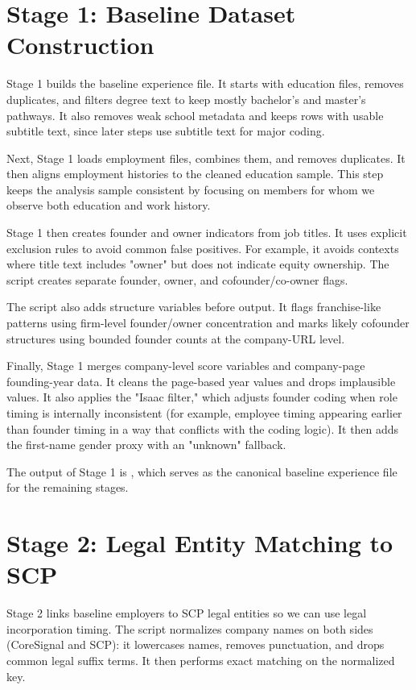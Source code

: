 \documentclass[12pt]{article}
\begin{document}
\section{Stage 1: Baseline Dataset Construction}

Stage 1 builds the baseline experience file. It starts with education files, removes duplicates, and filters degree text to keep mostly bachelor's and master's pathways. It also removes weak school metadata and keeps rows with usable subtitle text, since later steps use subtitle text for major coding.

Next, Stage 1 loads employment files, combines them, and removes duplicates. It then aligns employment histories to the cleaned education sample. This step keeps the analysis sample consistent by focusing on members for whom we observe both education and work history.

Stage 1 then creates founder and owner indicators from job titles. It uses explicit exclusion rules to avoid common false positives. For example, it avoids contexts where title text includes "owner" but does not indicate equity ownership. The script creates separate founder, owner, and cofounder/co-owner flags.

The script also adds structure variables before output. It flags franchise-like patterns using firm-level founder/owner concentration and marks likely cofounder structures using bounded founder counts at the company-URL level.

Finally, Stage 1 merges company-level score variables and company-page founding-year data. It cleans the page-based year values and drops implausible values. It also applies the "Isaac filter," which adjusts founder coding when role timing is internally inconsistent (for example, employee timing appearing earlier than founder timing in a way that conflicts with the coding logic). It then adds the first-name gender proxy with an "unknown" fallback.

The output of Stage 1 is , which serves as the canonical baseline experience file for the remaining stages.

\section{Stage 2: Legal Entity Matching to SCP}

Stage 2 links baseline employers to SCP legal entities so we can use legal incorporation timing. The script normalizes company names on both sides (CoreSignal and SCP): it lowercases names, removes punctuation, and drops common legal suffix terms. It then performs exact matching on the normalized key.
\end{document}
